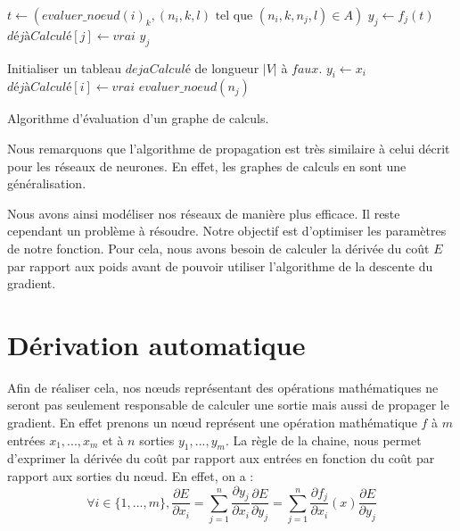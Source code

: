 \begin{algorithm} 
\begin{algorithmic}
		\State $t \leftarrow (evaluer\_noeud(i)_k, (n_i, k, l)\text{ tel que }(n_i, k, n_j, l) \in A)$
		\State $y_j \leftarrow f_j(t)$
		\State $déjàCalculé[j] \leftarrow vrai$
	\EndIf
	\State \Return $y_j$
\EndFunction

\State Initialiser un tableau $dejaCalculé$ de longueur $|V|$ à $faux$.
	\State $y_i \leftarrow x_i$
	\State $déjàCalculé[i] \leftarrow vrai$ 
\EndFor
{}
	\State $evaluer\_noeud(n_j)$ 
\EndFor
\EndProcedure
\end{algorithmic}
\caption{Algorithme d'évaluation d'un graphe de calculs.}
\label{propagation_memoisation}
\end{algorithm}

Nous remarquons que l'algorithme de propagation est très similaire à celui décrit pour les réseaux de neurones. En effet, les graphes de calculs en sont une généralisation.

Nous avons ainsi modéliser nos réseaux de manière plus efficace. Il reste cependant un problème à résoudre. Notre objectif est d'optimiser les paramètres de notre fonction. Pour cela, nous avons besoin de calculer la dérivée du coût $E$ par rapport aux poids avant de pouvoir utiliser l'algorithme de la descente du gradient.

\section{Dérivation automatique}

Afin de réaliser cela, nos n\oe{}uds représentant des opérations mathématiques ne seront pas seulement responsable de calculer une sortie mais aussi de propager le gradient. En effet prenons un n\oe{}ud représent une opération mathématique $f$ à $m$ entrées $x_1, ..., x_m$ et à $n$ sorties $y_1, ..., y_m$. La règle de la chaine, nous permet d'exprimer la dérivée du coût par rapport aux entrées en fonction du coût par rapport aux sorties du n\oe{}ud. En effet, on a :
\begin{equation}
\forall i \in \{1, ...,  m\}, \frac{\partial E}{\partial x_i} = \sum_{j=1}^{n}{\frac{\partial y_j}{\partial x_i}\frac{\partial E}{\partial y_j}} = \sum_{j=1}^{n}{\frac{\partial f_j}{\partial x_i}(x)\frac{\partial E}{\partial y_j}}
\label{retropropagation_graphe}
\end{equation}

